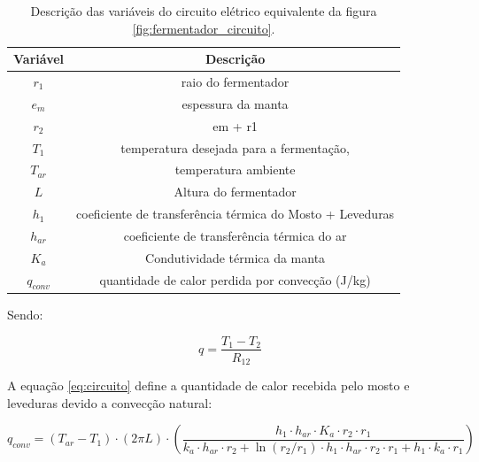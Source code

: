 \begin{table}
    \begin{center}
        \begin{tabular}{ |c|c| } 
            \hline
            Variável   &  Descrição  \\
            \hline
            \(r_1\)   &  raio do fermentador  \\
            \hline
            \(e_m\) &  espessura da manta \\
            \hline
            \(r_2\)   &  em + r1   \\
            \hline
            \(T_1\)  &  temperatura desejada para a fermentação, \\
            \hline
            \(T_{ar}\) &  temperatura ambiente  \\
            \hline
            \(L\)    &  Altura do fermentador  \\
            \hline
            \(h_1\)  &  coeficiente de transferência térmica do Mosto + Leveduras  \\
            \hline
            \(h_{ar}\) &  coeficiente de transferência térmica do ar \\
            \hline
            \(K_a\) & Condutividade térmica da manta  \\
            \hline
            \(q_{conv}\) & quantidade de calor perdida por convecção (J/kg) \\
            \hline
        \end{tabular}
        \caption{\label{tab:variaveis_circuito}Descrição das variáveis do circuito elétrico equivalente da figura \ref{fig:fermentador_circuito}.}
    \end{center}
\end{table}

Sendo:

\begin{equation}
    q = \dfrac{T_1 - T_2}{R_{12}}
\end{equation}


A equação \ref{eq:circuito} define a quantidade de calor recebida pelo mosto e leveduras devido a convecção natural:  


\begin{equation}
    q_{conv} = (T_{ar} - T_1) \cdot (2 \pi L) \cdot (\dfrac{h_1 \cdot h_{ar} \cdot K_a \cdot r_2 \cdot r_1}{k_a \cdot h_{ar} \cdot r_2 + \ln(r_2/r_1) \cdot h_1 \cdot h_{ar} \cdot r_2 \cdot r_1 + h_1 \cdot k_a \cdot r_1})
    \label{eq:circuito}
\end{equation}

